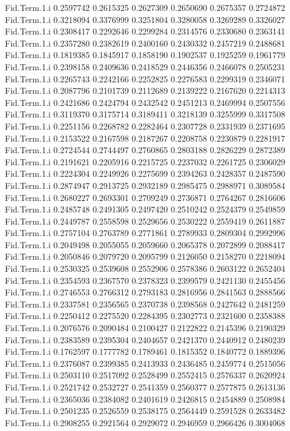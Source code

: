 \documentclass[11pt]{article} %
\begin{document}
\begin{Schunk}
\begin{Soutput}
Fid.Term.1.i 0.2597742 0.2615325 0.2627309 0.2650690 0.2675357 0.2724872
Fid.Term.1.i 0.3218094 0.3376999 0.3251804 0.3280058 0.3269289 0.3326027
Fid.Term.1.i 0.2308417 0.2292646 0.2299284 0.2314576 0.2330680 0.2363141
Fid.Term.1.i 0.2357280 0.2382619 0.2400160 0.2430332 0.2457219 0.2488681
Fid.Term.1.i 0.1819385 0.1845917 0.1858190 0.1902537 0.1925259 0.1961779
Fid.Term.1.i 0.2398158 0.2409636 0.2418529 0.2446356 0.2466078 0.2505231
Fid.Term.1.i 0.2265743 0.2242166 0.2252825 0.2276583 0.2299319 0.2346071
Fid.Term.1.i 0.2087796 0.2101739 0.2112689 0.2139222 0.2167620 0.2214313
Fid.Term.1.i 0.2421686 0.2424794 0.2432542 0.2451213 0.2469994 0.2507556
Fid.Term.1.i 0.3119370 0.3175714 0.3189411 0.3218139 0.3255999 0.3317508
Fid.Term.1.i 0.2251156 0.2268782 0.2282464 0.2307728 0.2331939 0.2371695
Fid.Term.1.i 0.2153522 0.2167598 0.2187267 0.2208758 0.2230879 0.2281917
Fid.Term.1.i 0.2724544 0.2744497 0.2760865 0.2803188 0.2826229 0.2872389
Fid.Term.1.i 0.2191621 0.2205916 0.2215725 0.2237032 0.2261725 0.2306029
Fid.Term.1.i 0.2224304 0.2249926 0.2275699 0.2394263 0.2428357 0.2487590
Fid.Term.1.i 0.2874947 0.2913725 0.2932189 0.2985475 0.2988971 0.3089584
Fid.Term.1.i 0.2680227 0.2693301 0.2709249 0.2736871 0.2764267 0.2816606
Fid.Term.1.i 0.2485748 0.2491305 0.2497420 0.2510242 0.2524379 0.2549859
Fid.Term.1.i 0.2449787 0.2558598 0.2529656 0.2530222 0.2559419 0.2611887
Fid.Term.1.i 0.2757104 0.2763789 0.2771861 0.2789933 0.2809304 0.2992996
Fid.Term.1.i 0.2049498 0.2055055 0.2059660 0.2065378 0.2072899 0.2088417
Fid.Term.1.i 0.2050846 0.2079720 0.2095799 0.2126050 0.2158270 0.2218094
Fid.Term.1.i 0.2530325 0.2539608 0.2552906 0.2578386 0.2603122 0.2652404
Fid.Term.1.i 0.2354593 0.2367570 0.2378323 0.2399579 0.2421130 0.2455456
Fid.Term.1.i 0.2746553 0.2766312 0.2793183 0.2816956 0.2841563 0.2888566
Fid.Term.1.i 0.2337581 0.2356565 0.2370738 0.2398568 0.2427642 0.2481259
Fid.Term.1.i 0.2250412 0.2275520 0.2284395 0.2302773 0.2321600 0.2358388
Fid.Term.1.i 0.2076576 0.2090484 0.2100427 0.2122822 0.2145396 0.2190329
Fid.Term.1.i 0.2383589 0.2395304 0.2404657 0.2421370 0.2440912 0.2480239
Fid.Term.1.i 0.1762597 0.1777782 0.1789461 0.1815352 0.1840772 0.1889396
Fid.Term.1.i 0.2376087 0.2399385 0.2413933 0.2436485 0.2459774 0.2515056
Fid.Term.1.i 0.2503110 0.2517092 0.2528499 0.2552415 0.2576337 0.2620924
Fid.Term.1.i 0.2521742 0.2532727 0.2541359 0.2560377 0.2577875 0.2613136
Fid.Term.1.i 0.2365036 0.2384082 0.2401619 0.2426815 0.2454889 0.2508984
Fid.Term.1.i 0.2501235 0.2526559 0.2538175 0.2564449 0.2591528 0.2633482
Fid.Term.1.i 0.2908255 0.2921564 0.2929072 0.2946959 0.2966426 0.3004068

\end{Soutput}
\end{Schunk}
\end{document}
